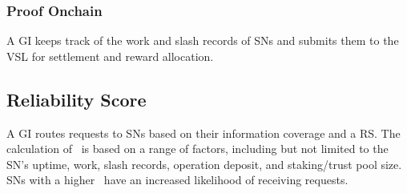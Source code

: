 \subsubsection{Proof Onchain} A GI keeps track of the work and slash records of \glspl{SN} and submits them to the \gls{VSL} for settlement and reward allocation.

\subsection{Reliability Score}

A \gls{GI} routes requests to \glspl{SN} based on their information coverage and a \gls{RS}.
The calculation of \reliabilityScore\ is based on a range of factors, including but not limited to the \gls{SN}'s uptime, work, slash records, operation deposit, and staking/trust pool size.
\glspl{SN} with a higher \reliabilityScore\ have an increased likelihood of receiving requests.
